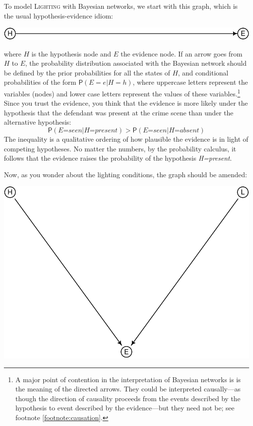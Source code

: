 \documentclass[
  11pt,
  dvipsnames,enabledeprecatedfontcommands]{scrartcl}
\newcommand{\pr}[1]{\ensuremath{\mathsf{P}(#1)}}
\begin{document}
To model \textsc{Lighting} with Bayesian networks, we start with this
graph, which is the usual hypothesis-evidence idiom:

\begin{center}\includegraphics[width=0.5\linewidth,height=0.5\textheight]{ReplyToSteeleStefansson5_files/figure-latex/heDAG-1} \end{center}

\noindent where \(H\) is the hypothesis node and \(E\) the evidence
node. If an arrow goes from \(H\) to \(E\), the probability distribution
associated with the Bayesian network should be defined by the prior
probabilities for all the states of \(H\), and conditional probabilities
of the form \(\pr{E=e \vert H=h}\), where uppercase letters represent
the variables (nodes) and lower case letters represent the values of
these variables.\footnote{A major point of contention in the
  interpretation of Bayesian networks is is the meaning of the directed
  arrows. They could be interpreted causally---as though the direction
  of causality proceeds from the events described by the hypothesis to
  event described by the evidence---but they need not be; see footnote
  \ref{footnote:causation}.} Since you trust the evidence, you think
that the evidence is more likely under the hypothesis that the defendant
was present at the crime scene than under the alternative hypothesis:
\[\pr{\textit{E=seen} \vert \textit{H=present}} > \pr{\textit{E=seen} \vert \textit{H=absent}}\]
The inequality is a qualitative ordering of how plausible the evidence
is in light of competing hypotheses. No matter the numbers, by the
probability calculus, it follows that the evidence raises the
probability of the hypothesis \textit{H=present}.

Now, as you wonder about the lighting conditions, the graph should be
amended:

\begin{center}\includegraphics[width=0.5\linewidth,height=0.3\textheight]{ReplyToSteeleStefansson5_files/figure-latex/lighting2DAG-1} \end{center}
\end{document}
